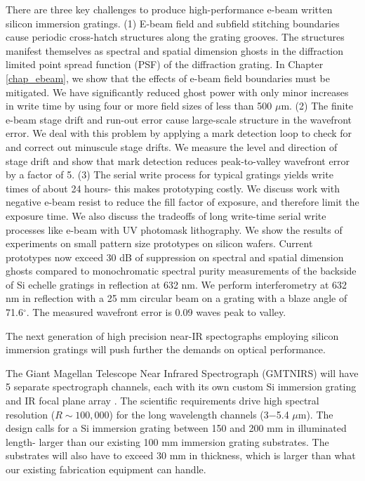 There are three key challenges to produce high-performance e-beam written silicon immersion gratings.  (1) E-beam field and subfield stitching boundaries cause periodic cross-hatch structures along the grating grooves.   The structures manifest themselves as spectral and spatial dimension ghosts in the diffraction limited point spread function (PSF) of the diffraction grating.  In Chapter \ref{chap_ebeam}, we show that the effects of e-beam field boundaries must be mitigated.  We have significantly reduced ghost power with only minor increases in write time by using four or more field sizes of less than 500 $\mu$m. (2) The finite e-beam stage drift and run-out error cause large-scale structure in the wavefront error.  We deal with this problem by applying a mark detection loop to check for and correct out minuscule stage drifts.  We measure the level and direction of stage drift and show that mark detection reduces peak-to-valley wavefront error by a factor of 5. (3) The serial write process for typical gratings yields write times of about 24 hours- this makes prototyping costly.  We discuss work with negative e-beam resist to reduce the fill factor of exposure, and therefore limit the exposure time.
We also discuss the tradeoffs of long write-time serial write processes like e-beam with UV photomask lithography.  We show the results of experiments on small pattern size prototypes on silicon wafers.  Current prototypes now exceed 30 dB of suppression on spectral and spatial dimension ghosts compared to monochromatic spectral purity measurements of the backside of Si echelle gratings in reflection at 632 nm.  We perform interferometry at 632 nm in reflection with a 25 mm circular beam on a grating with a blaze angle of 71.6$^\circ$.  The measured wavefront error is 0.09 waves peak to valley.

The next generation of high precision near-IR spectographs employing silicon immersion gratings will push further the demands on optical performance.  

The Giant Magellan Telescope Near Infrared Spectrograph (GMTNIRS) will have 5 separate spectrograph channels, each with its own custom Si immersion grating and IR focal plane array \citep{2014SPIE.9147E..22J}.  The scientific requirements drive high spectral resolution ($R\sim100,000$) for the long wavelength channels (3$-$5.4 $\mu$m).  The design calls for a Si immersion grating between 150 and 200 mm in illuminated length- larger than our existing 100 mm immersion grating substrates.  The substrates will also have to exceed 30 mm in thickness, which is larger than what our existing fabrication equipment can handle.  


